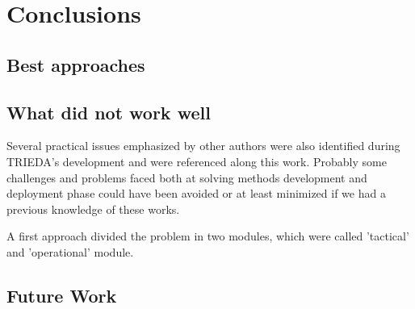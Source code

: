 \chapter{Conclusions}
\label{chap:conclusions}




\section{Best approaches}



\section{What did not work well}

Several practical issues emphasized by other authors were also identified during TRIEDA's development and were referenced along this work. Probably some challenges and problems faced both at solving methods development and deployment phase could have been avoided or at least minimized if we had a previous knowledge of these works.


A first approach divided the problem in two modules, which were called 'tactical' and 'operational' module.



\section{Future Work}





